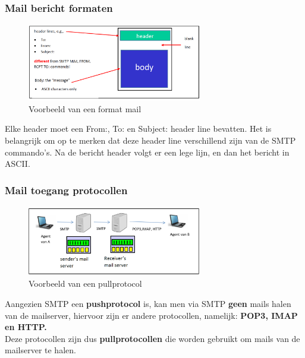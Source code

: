 \clearpage

\subsubsection{Mail bericht formaten}

\begin{figure}[h]
\centering
\includegraphics[width=3in]{./img/imghfdst2/formatmail.PNG}
\caption{Voorbeeld van een format mail }
\label{fig:format mail}
\end{figure}

\noindent Elke header moet een From:, To: en Subject: header line bevatten. Het is belangrijk om op te merken dat deze header line verschillend zijn van de SMTP commando’s. Na de bericht header volgt er een lege lijn, en dan het bericht in ASCII.

\subsubsection{Mail toegang protocollen}

\begin{figure}[h]
\centering
\includegraphics[width=3in]{./img/imghfdst2/access.PNG}
\caption{Voorbeeld van een pullprotocol }
\label{fig:pullprotocol}
\end{figure}

\noindent Aangezien SMTP een \textbf{pushprotocol} is, kan men via SMTP \textbf{geen} mails halen van de mailserver, hiervoor zijn er andere protocollen, namelijk: \textbf{POP3, IMAP en HTTP.}\\

\noindent Deze protocollen zijn dus \textbf{pullprotocollen} die worden gebruikt om mails van de mailserver te halen.



